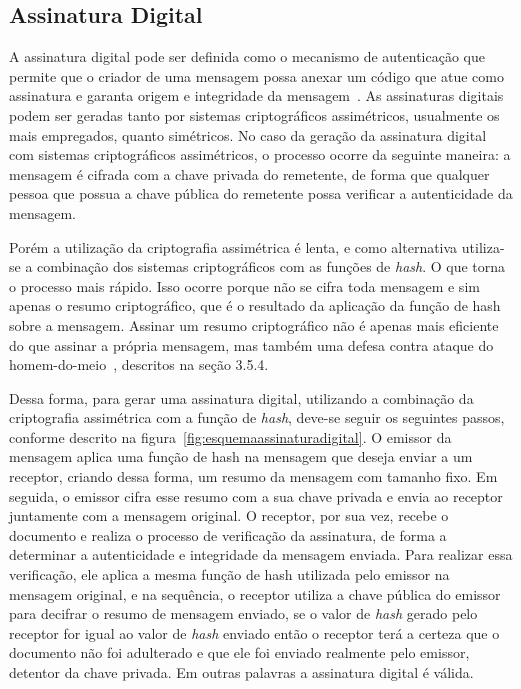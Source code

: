 \subsection{Assinatura Digital}

A assinatura digital pode ser definida como o mecanismo de autenticação que permite que o criador de uma mensagem possa anexar um código que atue como assinatura e garanta origem e integridade da mensagem~\cite{stallings2008}. As assinaturas digitais podem ser geradas tanto por sistemas criptográficos assimétricos, usualmente os mais empregados, quanto simétricos. No caso da geração da assinatura digital com sistemas criptográficos assimétricos, o processo ocorre da seguinte maneira: a mensagem é cifrada com a chave privada do remetente, de forma que qualquer pessoa que possua a chave pública do remetente possa verificar a autenticidade da mensagem.

Porém a utilização da criptografia assimétrica é lenta, e como alternativa utiliza-se a combinação dos sistemas criptográficos com as funções de \emph{hash}. O que torna o processo mais rápido. Isso ocorre porque não se cifra toda mensagem e sim apenas o resumo criptográfico, que é o resultado da aplicação da função de hash sobre a mensagem. Assinar um resumo criptográfico não é apenas mais eficiente do que assinar a própria mensagem, mas também uma defesa contra ataque do homem-do-meio~\cite{goodrich2013}, descritos na seção 3.5.4.

Dessa forma, para gerar uma assinatura digital, utilizando a combinação da criptografia assimétrica com a função de \emph{hash}, deve-se seguir os seguintes passos, conforme descrito na figura~\ref{fig:esquemaassinaturadigital}. O emissor da mensagem aplica uma função de hash na mensagem que deseja enviar a um receptor, criando dessa forma, um resumo da mensagem com tamanho fixo. Em seguida, o emissor cifra esse resumo com a sua chave privada e envia ao receptor juntamente com a mensagem original. O receptor, por sua vez, recebe o documento e realiza o processo de verificação da assinatura, de forma a determinar a autenticidade e integridade da mensagem enviada. Para realizar essa verificação, ele aplica a mesma função de hash utilizada pelo emissor na mensagem original, e na sequência, o receptor utiliza a chave pública do emissor para decifrar o resumo de mensagem enviado, se o valor de \emph{hash} gerado pelo receptor  for igual ao valor de \emph{hash} enviado então o receptor terá a certeza que o documento não foi adulterado e que ele foi enviado realmente pelo emissor, detentor da chave privada. Em outras palavras a assinatura digital é válida.

